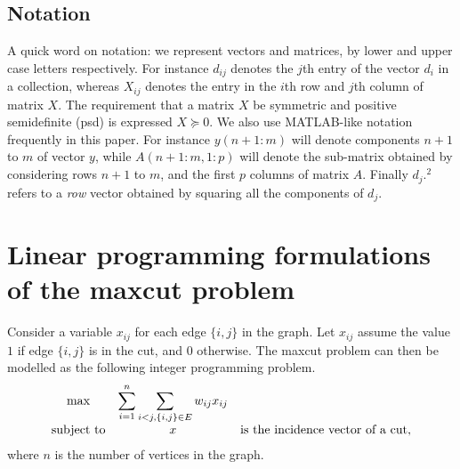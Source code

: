 \documentclass[12pt]{article}
\begin{document}
\subsection{Notation}
A quick word on notation: we represent vectors and matrices, by
lower and upper case letters respectively. For instance $d_{ij}$
denotes the $j$th entry of the vector $d_i$ in a collection,
whereas $X_{ij}$ denotes the entry in the $i$th row and $j$th
column of matrix $X$. The requirement that a matrix $X$ be
symmetric and positive semidefinite (psd) is expressed $X \succeq 0$. We also
use MATLAB-like notation frequently in this paper. For instance
$y(n+1:m)$ will denote components $n+1$ to $m$ of vector $y$,
while $A(n+1:m,1:p)$ will denote the sub-matrix obtained by
considering rows $n+1$ to $m$, and the first $p$ columns of matrix
$A$. Finally ${d_j}.^ 2$ refers to a {\em row} vector obtained by
squaring all the components of $d_j$.

\section{Linear programming formulations of the maxcut problem}

\label{lp_formulations_of_maxcut} Consider a variable $x_{ij}$ for
each edge $\{i,j\}$ in the graph. Let $x_{ij}$ assume the value
$1$ if edge $\{i,j\}$ is in the cut, and $0$ otherwise. The maxcut
problem can then be modelled as the following integer programming
problem.
\begin{eqnarray}
\label{maxcut_as_ip}
\begin{array}{ccc}
\max & \displaystyle \displaystyle \sum_{i=1}^n \sum_{i<j, \{i,j\} \in E} w_{ij} x_{ij} \\
\mbox{subject to} & x & \mbox{is the incidence vector of a cut},
\end{array}
\end{eqnarray}
where $n$ is the number of vertices in the graph.
\end{document}

